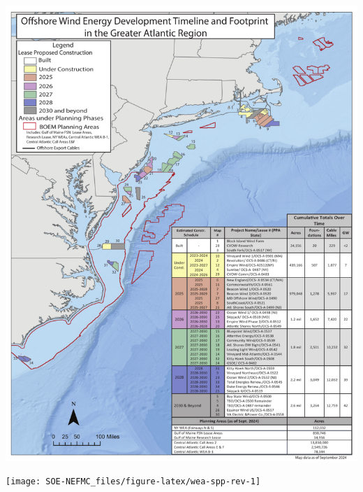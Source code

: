 \documentclass[
  10pt,
]{article}
\let\origfigure\figure
\let\endorigfigure\endfigure
\renewenvironment{figure}[1][2] {
    \expandafter\origfigure\expandafter[H]
} {
    \endorigfigure
}
\begin{document}
\begin{figure}

{\centering \includegraphics[width=0.9\linewidth]{SOE-NEFMC_files/figure-latex/wind-dev-cumul2-1} 

}

\caption{All Northeast Project areas by year construction ends (each project has 2 year construction period).}\label{fig:wind-dev-cumul2}
\end{figure}

\begin{figure}

{\centering \texttt{[image: SOE-NEFMC\_files/figure-latex/wea-spp-rev-1]} 

}

\caption{Fishery revenues from NEFMC managed species in the Wind energy lease areas.}\label{fig:wea-spp-rev}
\end{figure}
\providecommand{\docline}[3]{\noalign{\global\setlength{\arrayrulewidth}{#1}}\arrayrulecolor[HTML]{#2}\cline{#3}}

\setlength{\tabcolsep}{2pt}

\renewcommand*{\arraystretch}{1}
\end{document}
